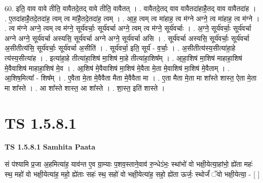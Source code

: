 \documentclass[17pt]{extarticle}
\begin{document}
60. इति॒ वाव वावे तीति॒ वावैतदे॒तद् वावे तीति॒ वावैतत् । . वावैतदे॒तद् वाव वावैतदा॑हाहै॒तद् वाव वावैतदा॑ह । . ए॒तदा॑हाहै॒तदे॒तदा॑ह॒ त्वम् त्व मा॑है॒तदे॒तदा॑ह॒ त्वम् । . आ॒ह॒ त्वम् त्व मा॑हाह॒ त्व म॑ग्ने अग्ने॒ त्व मा॑हाह॒ त्व म॑ग्ने । . त्व म॑ग्ने अग्ने॒ त्वम् त्व म॑ग्ने॒ सूर्य॑वर्चाः॒ सूर्य॑वर्चा अग्ने॒ त्वम् त्व म॑ग्ने॒ सूर्य॑वर्चाः । . अ॒ग्ने॒ सूर्य॑वर्चाः॒ सूर्य॑वर्चा अग्ने अग्ने॒ सूर्य॑वर्चा अस्यसि॒ सूर्य॑वर्चा अग्ने अग्ने॒ सूर्य॑वर्चा असि । . सूर्य॑वर्चा अस्यसि॒ सूर्य॑वर्चाः॒ सूर्य॑वर्चा अ॒सीतीत्य॑सि॒ सूर्य॑वर्चाः॒ सूर्य॑वर्चा अ॒सीति॑ । . सूर्य॑वर्चा॒ इति॒ सूर्य॑ - व॒र्चाः॒ । . अ॒सीतीत्य॑स्य॒सीत्या॑हा॒हे त्य॑स्य॒सीत्या॑ह । . इत्या॑हा॒हे तीत्या॑हा॒शिष॑ मा॒शिष॑ मा॒हे तीत्या॑हा॒शिष᳚म् । . आ॒हा॒शिष॑ मा॒शिष॑ माहाहा॒शिष॑ मे॒वैवाशिष॑ माहाहा॒शिष॑ मे॒व । . आ॒शिष॑ मे॒वैवाशिष॑ मा॒शिष॑ मे॒वैता मे॒ता मे॒वाशिष॑ मा॒शिष॑ मे॒वैताम् । . आ॒शिष॒मित्या᳚ - शिष᳚म् । . ए॒वैता मे॒ता मे॒वैवैता मैता मे॒वैवैता मा । . ए॒ता मैता मे॒ता मा शा᳚स्ते शास्त॒ ऐता मे॒ता मा शा᳚स्ते । . आ शा᳚स्ते शास्त॒ आ शा᳚स्ते । . शा॒स्त॒ इति॑ शास्ते । \newline
\pagebreak
{}
\section*{ TS 1.5.8.1 }

\textbf{TS 1.5.8.1 } \newline
\textbf{Samhita Paata} \newline

सं प॑श्यामि प्र॒जा अ॒हमित्या॑ह॒ याव॑न्त ए॒व ग्रा॒म्याः प॒शव॒स्ताने॒वाव॑ रु॒न्धेऽंभः॒ स्थांभो॑ वो भक्षी॒येत्या॒हांभो॒ ह्ये॑ता महः॑ स्थ॒ महो॑ वो भक्षी॒येत्या॑ह॒ महो॒ ह्ये॑ताः सहः॑ स्थ॒ सहो॑ वो भक्षी॒येत्या॑ह॒ सहो॒ ह्ये॑ता ऊर्जः॒ स्थोर्जं॑ ॅवो भक्षी॒येत्या॒ - [ ] \newline
\end{document}
